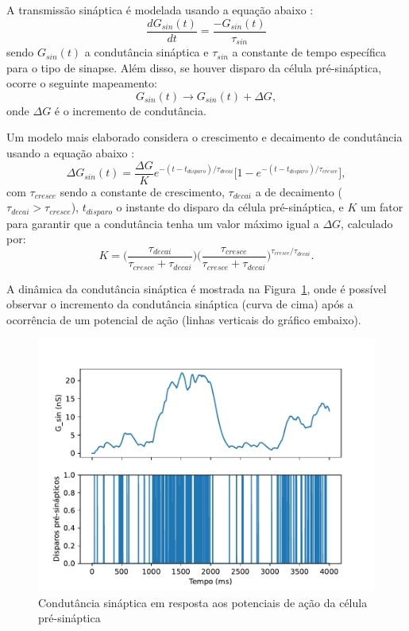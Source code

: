 A transmissão sináptica é modelada usando a equação abaixo \cite{dayan_theoretical_2001}:
\begin{equation}\label{eq:sinapse}
	\frac{dG_{sin}(t)}{dt}=\frac{-G_{sin}(t)}{\tau_{sin}}
\end{equation}
sendo $G_{sin}(t)$ a condutância sináptica e $\tau_{sin}$ a constante de tempo específica para o tipo de sinapse. Além disso, se houver disparo da célula pré-sináptica, ocorre o seguinte mapeamento:
\begin{equation}\label{eq:sinapse_mapeamento}
	G_{sin}(t)\to G_{sin}(t)+\Delta G,
\end{equation}
onde $\Delta G$ é o incremento de condutância.

Um modelo mais elaborado considera o crescimento e decaimento de condutância usando a equação abaixo \cite{miller_introductory_2018}:
\begin{equation}\label{eq:sinapse_delta}
	\Delta G_{sin}(t)=\frac{\Delta G}{K}e^{-(t-t_{disparo})/\tau_{decai}}\Big[1-e^{-(t-t_{disparo})/\tau_{cresce}}\Big],
\end{equation}
com $\tau_{cresce}$ sendo a constante de crescimento, $\tau_{decai}$ a de decaimento ($\tau_{decai}>\tau_{cresce}$), $t_{disparo}$ o instante do disparo da célula pré-sináptica, e $K$ um fator para garantir que a condutância tenha um valor máximo igual a $\Delta G$, calculado por:
\begin{equation}\label{eq:sinapse_k}
	K=\Bigg(\frac{\tau_{decai}}{\tau_{cresce}+\tau_{decai}}\Bigg)\Bigg(\frac{\tau_{cresce}}{\tau_{cresce}+\tau_{decai}}\Bigg)^{\tau_{cresce}/\tau_{decai}}.
\end{equation}

A dinâmica da condutância sináptica é mostrada na Figura~\ref{fig:respostasinaptica}, onde é possível observar o incremento da condutância sináptica (curva de cima) após a ocorrência de um potencial de ação (linhas verticais do gráfico embaixo).

\begin{figure}[tb]
	\centering
	\caption{Condutância sináptica em resposta aos potenciais de ação da célula pré-sináptica}
	\label{fig:respostasinaptica}
	\includegraphics[width=0.7\linewidth]{figs/resposta_sinaptica}
\end{figure}

